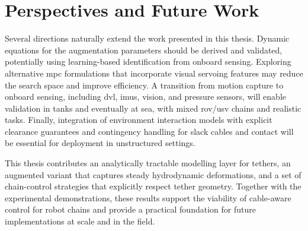\section{Perspectives and Future Work}
\label{c_perspectives}

Several directions naturally extend the work presented in this thesis. Dynamic equations for the
augmentation parameters should be derived and validated, potentially using learning-based
identification from onboard sensing. Exploring alternative \ac{mpc} formulations that incorporate
visual servoing features may reduce the search space and improve efficiency. A transition from
motion capture to onboard sensing, including \ac{dvl}, \acp{imu}, vision, and pressure sensors,
will enable validation in tanks and eventually at sea, with mixed \ac{rov}/\ac{usv} chains and
realistic tasks. Finally, integration of environment interaction models with explicit clearance
guarantees and contingency handling for slack cables and contact will be essential for deployment
in unstructured settings.

This thesis contributes an analytically tractable modelling layer for tethers, an augmented variant
that captures steady hydrodynamic deformations, and a set of chain-control strategies that
explicitly respect tether geometry. Together with the experimental demonstrations, these results
support the viability of cable-aware control for robot chains and provide a practical foundation
for future implementations at scale and in the field.
